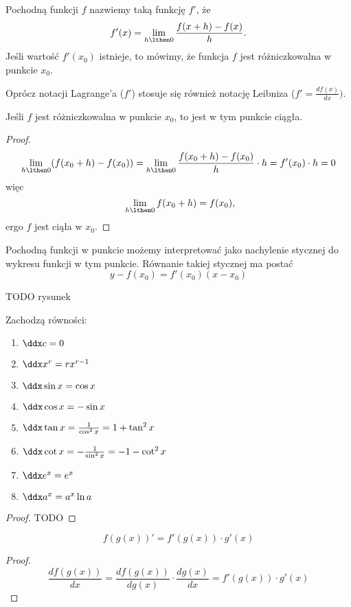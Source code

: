 \begin{definition}
    Pochodną funkcji $f$ nazwiemy taką funkcję $f'$, że
    \[ f'(x) = \lim_{h\lthen 0}\frac{f(x + h) - f(x)}{h}. \]
    Jeśli wartość $f'(x_0)$ istnieje, to mówimy, że funkcja $f$ jest różniczkowalna w punkcie $x_0$.
\end{definition}

Oprócz notacji Lagrange'a ($f'$) stosuje się również notację Leibniza ($f' = \frac{df(x)}{dx})$.

\begin{theorem}
    Jeśli $f$ jest różniczkowalna w punkcie $x_0$, to jest w tym punkcie ciągła.
\end{theorem}
\begin{proof}
    \[ \lim_{h \lthen 0}(f(x_0 + h) - f(x_0)) = \lim_{h \lthen 0}\frac{f(x_0 + h) - f(x_0)}{h} \cdot h = f'(x_0) \cdot h = 0 \]
    więc
    \[\ \lim_{h\lthen 0}f(x_0 + h) = f(x_0), \]
    ergo $f$ jest ciąła w $x_0$.
\end{proof}

Pochodną funkcji w punkcie możemy interpretować jako nachylenie stycznej do wykresu funkcji w tym punkcie. Równanie takiej stycznej ma postać
\begin{equation}
    y - f(x_0) = f'(x_0)(x - x_0)
\end{equation}

TODO rysunek

\begin{theorem}
    Zachodzą równości:
    \begin{enumerate}
        \item $\ddx c = 0$
        \item $\ddx x^r = rx^{r-1}$
        \item $\ddx \sin x = \cos x$
        \item $\ddx \cos x = -\sin x$
        \item $\ddx \tan x = \frac{1}{\cos^2 x} = 1 + \tan^2 x$
        \item $\ddx \cot x = - \frac{1}{\sin^2 x} = -1 - \cot^2 x$
        \item $\ddx e^x = e^x$
        \item $\ddx a^x = a^x \ln a$
    \end{enumerate}
\end{theorem}
\begin{proof}
    TODO
\end{proof}

\begin{theorem}
    \[ f(g(x))' = f'(g(x)) \cdot g'(x) \]
\end{theorem}
\begin{proof}
    \[ \frac{df(g(x))}{dx} = \frac{df(g(x))}{dg(x)}\cdot\frac{dg(x)}{dx} = f'(g(x)) \cdot g'(x) \]
\end{proof}

